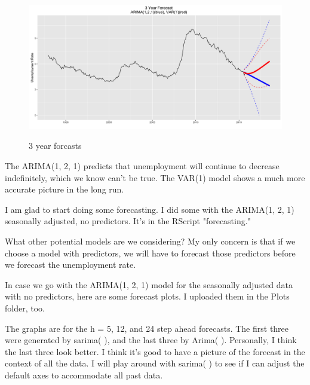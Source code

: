 \documentclass[twoside,twocolumn]{article}
\begin{document}
       \begin{figure}[htb]
    	\centering
     	\caption{3 year forcasts}
     	\includegraphics[width=\linewidth]{images/forcast3}
     	\label{fig:forcasts2}
      \end{figure}
      
      The ARIMA(1, 2, 1) predicts that unemployment will continue to decrease indefinitely, which we know can't be true. The VAR(1) model shows a much more accurate picture in the long run.

      
      I am glad to start doing some forecasting. I did some with the ARIMA(1, 2, 1) seasonally adjusted, no predictors. It's in the RScript "forecasting."

What other potential models are we considering? My only concern is that if we choose a model with predictors, we will have to forecast those predictors before we forecast the unemployment rate.

In case we go with the ARIMA(1, 2, 1) model for the seasonally adjusted data with no predictors, here are some forecast plots. I uploaded them in the Plots folder, too.

The graphs are for the h = 5, 12, and 24 step ahead forecasts. The first three were generated by sarima( ), and the last three by Arima( ). Personally, I think the last three look better. I think it's good to have a picture of the forecast in the context of all the data. I will play around with sarima( ) to see if I can adjust the default axes to accommodate all past data.
\end{document}
